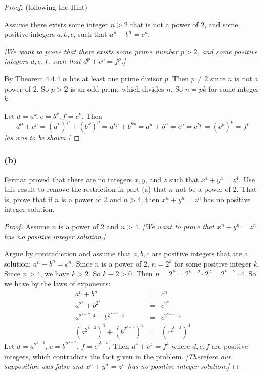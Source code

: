 \documentclass[14pt]{extarticle}
\begin{document}
\begin{proof}
(following the Hint)

Assume there exists some integer $n > 2$ that is not a power of 2, and some positive integers $a,b,c$, such that $a^n + b^n = c^n$.

{\it [We want to prove that there exists some prime number $p > 2$, and some positive integers $d,e,f$, such that $d^p + e^p = f^p$.]}

By Theorem 4.4.4 $n$ has at least one prime divisor $p$. Then $p \neq 2$ since $n$ is not a power of 2. So $p > 2$ is an odd prime which divides $n$. So $n = pk$ for some integer $k$.

Let $d = a^k, e = b^k, f = c^k$. Then
\[
d^p + e^p = (a^k)^p + (b^k)^p = a^{kp} + b^{kp} = a^n + b^n = c^n = c^{kp} = (c^k)^p = f^p
\]
{\it [as was to be shown.]}
\end{proof}

\subsubsection{(b)}
Fermat proved that there are no integers $x, y$, and $z$ such that $x^4 + y^4 = z^4$. Use this result to remove the restriction in part (a) that $n$ not be a power of 2. That is, prove that if $n$ is a power of 2 and $n > 4$, then $x^n + y^n = z^n$ has no positive integer solution.

\begin{proof}
Assume $n$ is a power of 2 and $n > 4$. {\it [We want to prove that $x^n + y^n = z^n$ has no positive integer solution.]}

Argue by contradiction and assume that $a,b,c$ are positive integers that are a solution: $a^n + b^n = c^n$. Since $n$ is a power of 2, $n = 2^k$ for some positive integer $k$. Since $n > 4$, we have $k > 2$. So $k-2 > 0$. Then $n = 2^k = 2^{k-2} \cdot 2^2 = 2^{k-2} \cdot 4$. So we have by the laws of exponents:
\[
\begin{array}{ccc}
a^n + b^n & = & c^n \\
a^{2^k} + b^{2^k} & = & c^{2^k} \\
a^{2^{k-2}\cdot 4} + b^{2^{k-2}\cdot 4} & = & c^{2^{k-2}\cdot 4} \\
\left(a^{2^{k-2}}\right)^4 + \left(b^{2^{k-2}}\right)^4 & = & \left(c^{2^{k-2}}\right)^4
\end{array}
\]
Let $d = a^{2^{k-2}}$, $e = b^{2^{k-2}}$, $f = c^{2^{k-2}}$. Then $d^4 + e^4 = f^4$ where $d,e,f$ are positive integers, which contradicts the fact given in the problem. {\it [Therefore our supposition was false and $x^n + y^n = z^n$ has no positive integer solution.]}
\end{proof}
\end{document}
